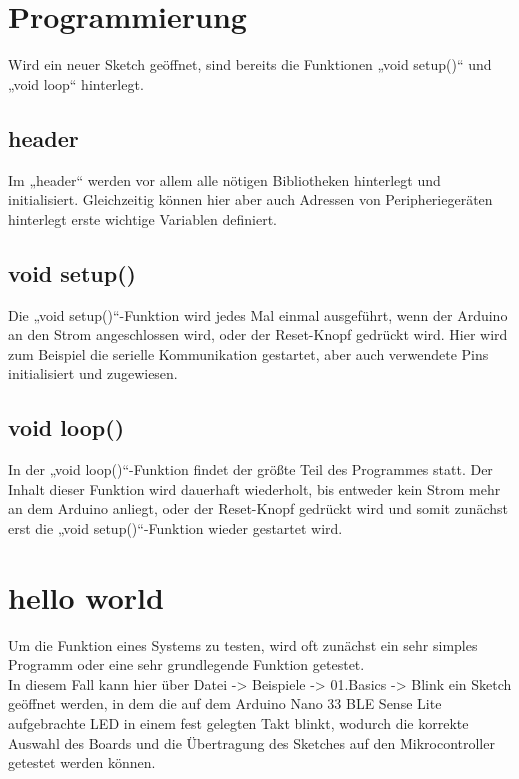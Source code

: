 \section{Programmierung}
Wird ein neuer Sketch geöffnet, sind bereits die Funktionen „void setup()“ und „void loop“ hinterlegt.

\subsection{header}
Im „header“ werden vor allem alle nötigen Bibliotheken hinterlegt und initialisiert. Gleichzeitig können hier aber auch Adressen von Peripheriegeräten hinterlegt erste wichtige Variablen definiert.

\subsection{void setup()}
Die „void setup()“-Funktion wird jedes Mal einmal ausgeführt, wenn der Arduino an den Strom angeschlossen wird, oder der Reset-Knopf gedrückt wird.
Hier wird zum Beispiel die serielle Kommunikation gestartet, aber auch verwendete Pins initialisiert und zugewiesen.

\subsection{void loop()}
In der „void loop()“-Funktion findet der größte Teil des Programmes statt. Der Inhalt dieser Funktion wird dauerhaft wiederholt, bis entweder kein Strom mehr an dem Arduino anliegt, oder der Reset-Knopf gedrückt wird und somit zunächst erst die „void setup()“-Funktion wieder gestartet wird.

\section{hello world}
Um die Funktion eines Systems zu testen, wird oft zunächst ein sehr simples Programm oder eine sehr grundlegende Funktion getestet.\\
In diesem Fall kann hier über Datei -> Beispiele -> 01.Basics -> Blink ein Sketch geöffnet werden, in dem die auf dem Arduino Nano 33 BLE Sense Lite aufgebrachte LED in einem fest gelegten Takt blinkt, wodurch die korrekte Auswahl des Boards und die Übertragung des Sketches auf den Mikrocontroller getestet werden können. \\

%


